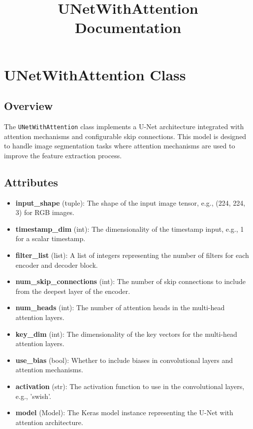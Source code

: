 \documentclass{article}
\title{UNetWithAttention Documentation}
\author{}
\date{}
\begin{document}
\maketitle

\section{UNetWithAttention Class}

\subsection{Overview}

The \texttt{UNetWithAttention} class implements a U-Net architecture integrated with attention mechanisms and configurable skip connections. This model is designed to handle image segmentation tasks where attention mechanisms are used to improve the feature extraction process.

\subsection{Attributes}

\begin{itemize}
    \item \textbf{input\_shape} (tuple): The shape of the input image tensor, e.g., (224, 224, 3) for RGB images.
    \item \textbf{timestamp\_dim} (int): The dimensionality of the timestamp input, e.g., 1 for a scalar timestamp.
    \item \textbf{filter\_list} (list): A list of integers representing the number of filters for each encoder and decoder block.
    \item \textbf{num\_skip\_connections} (int): The number of skip connections to include from the deepest layer of the encoder.
    \item \textbf{num\_heads} (int): The number of attention heads in the multi-head attention layers.
    \item \textbf{key\_dim} (int): The dimensionality of the key vectors for the multi-head attention layers.
    \item \textbf{use\_bias} (bool): Whether to include biases in convolutional layers and attention mechanisms.
    \item \textbf{activation} (str): The activation function to use in the convolutional layers, e.g., 'swish'.
    \item \textbf{model} (Model): The Keras model instance representing the U-Net with attention architecture.
\end{itemize}
\end{document}
